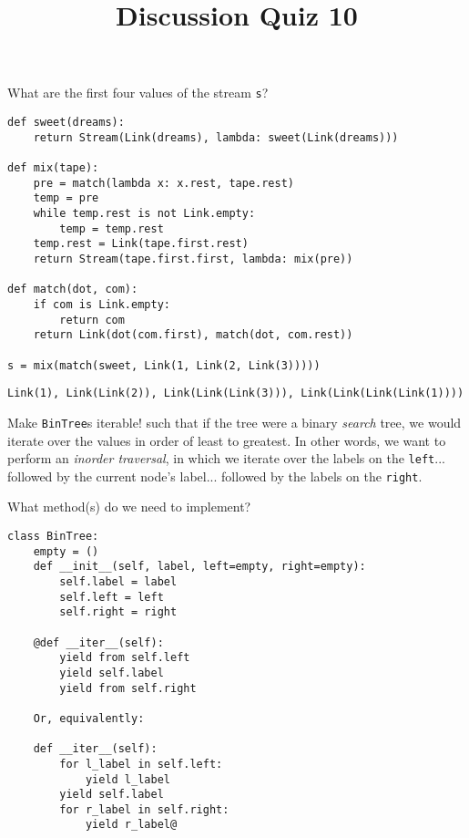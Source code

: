 \documentclass[twoside]{article}
\title{\sc Discussion Quiz 10 \solution{Solutions}}
\newcommand{\solution}[1]{{\color{red}#1}}
\begin{document}
\maketitle

\begin{enumerate}

What are the first four values of the stream \lstinline{s}?
\vspace{0.1in}

\begin{lstlisting}
def sweet(dreams):
    return Stream(Link(dreams), lambda: sweet(Link(dreams)))

def mix(tape):
    pre = match(lambda x: x.rest, tape.rest)
    temp = pre
    while temp.rest is not Link.empty:
        temp = temp.rest
    temp.rest = Link(tape.first.rest)
    return Stream(tape.first.first, lambda: mix(pre))

def match(dot, com):
    if com is Link.empty:
        return com
    return Link(dot(com.first), match(dot, com.rest))

s = mix(match(sweet, Link(1, Link(2, Link(3)))))
\end{lstlisting}

\:
\solution{\lstinline{Link(1), Link(Link(2)), Link(Link(Link(3))), Link(Link(Link(Link(1))))}}

\newpage


Make \lstinline{BinTree}s iterable! such that if the tree were a binary \textit{search} tree, we would iterate over the values in order of least to greatest. In other words, we want to perform an \textit{inorder traversal}, in which we iterate over the labels on the \lstinline{left}... followed by the current node's label... followed by the labels on the \lstinline{right}.

What method(s) do we need to implement?
\vspace{0.1in}

\begin{lstlisting}
class BinTree:
    empty = ()
    def __init__(self, label, left=empty, right=empty):
        self.label = label
        self.left = left
        self.right = right

    @def __iter__(self):
        yield from self.left
        yield self.label
        yield from self.right
        
    Or, equivalently:
    
    def __iter__(self):
        for l_label in self.left:
            yield l_label
        yield self.label
        for r_label in self.right:
            yield r_label@
\end{lstlisting}

\end{enumerate}
\end{document}
